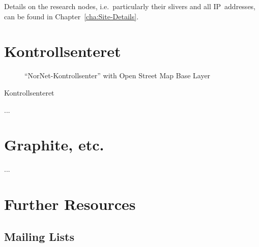 Details on the research nodes, i.e.\ particularly their slivers and all IP~addresses, can be found in Chapter~\ref{cha:Site-Details}.



\section{Kontrollsenteret}
\label{sec:Kontrollsenteret}

\begin{figure*}
\begin{center}
\end{center}
\caption{``NorNet-Kontrollsenter'' with Open Street Map Base Layer}
\label{cap:Kontrollsenteret-Site-Information}
\end{figure*}

Kontrollsenteret

...



\section{Graphite, etc.}
\label{sec:...}

...



\section{Further Resources}

\subsection{Mailing Lists}


